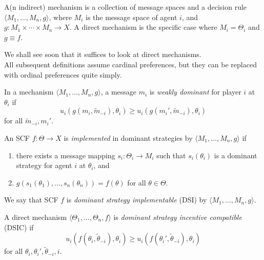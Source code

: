 	\begin{fdef}
		A(n indirect) mechanism is a collection of message spaces and a decision rule $\langle M_1,\ldots,M_n,g\rangle$, where $M_i$ is the message space of agent $i$, and $g : M_1 \times \cdots \times M_n \to X$. A direct mechanism is the specific case where $M_i = \Theta_i$ and $g \equiv f$.
	\end{fdef}

	We shall see soon that it suffices to look at direct mechanisms.\\
	All subsequent definitions assume cardinal preferences, but they can be replaced with ordinal preferences quite simply.

	\begin{fdef}
		In a mechanism $\langle M_1,\ldots,M_n,g\rangle$, a message $m_i$ is \emph{weakly dominant} for player $i$ at $\theta_i$ if
		\begin{equation}
			\label{eqn: weakly dominant}
			u_i(g(m_i,\widetilde{m}_{-i}),\theta_i) \ge u_i(g(m_i',\widetilde{m}_{-i}),\theta_i)
		\end{equation}
		for all $\widetilde{m}_{-i},m_i'$.
	\end{fdef}

	\begin{fdef}
		 An SCF $f : \Theta \to X$ is \emph{implemented} in dominant strategies by $\langle M_1,\ldots,M_n,g\rangle$ if
		 \begin{enumerate}
		 	\item there exists a message mapping $s_i : \Theta_i \to M_i$ such that $s_i(\theta_i)$ is a dominant strategy for agent $i$ at $\theta_i$, and
		 	\item $g(s_1(\theta_1),\ldots,s_n(\theta_n)) = f(\theta)$ for all $\theta \in \Theta$.
		 \end{enumerate}
		We say that SCF $f$ is \emph{dominant strategy implementable} (DSI) by $\langle M_1,\ldots,M_n,g\rangle$.
	\end{fdef}

	\begin{fdef}
		\label{def: dsic}
		A direct mechanism $\langle \Theta_1,\ldots,\Theta_n,f\rangle$ is \emph{dominant strategy incentive compatible} (DSIC) if
		\begin{equation}
			\label{eqn: dsic}
			u_i(f(\theta_i,\widetilde{\theta}_{-i}),\theta_i) \ge u_i(f(\theta_i',\widetilde{\theta}_{-i}),\theta_i)
		\end{equation}
		for all $\theta_i,\theta_i',\widetilde{\theta}_{-i},i$.
	\end{fdef}


